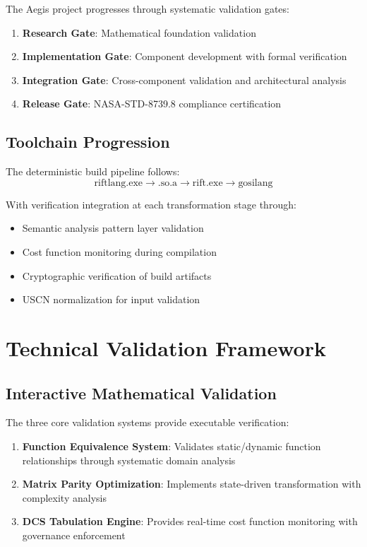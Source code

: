 \documentclass{article}
\begin{document}
The Aegis project progresses through systematic validation gates:

\begin{enumerate}
    \item \textbf{Research Gate}: Mathematical foundation validation
    \item \textbf{Implementation Gate}: Component development with formal verification
    \item \textbf{Integration Gate}: Cross-component validation and architectural analysis
    \item \textbf{Release Gate}: NASA-STD-8739.8 compliance certification
\end{enumerate}

\subsection{Toolchain Progression}

The deterministic build pipeline follows:
\[ \text{riftlang.exe} \to \text{.so.a} \to \text{rift.exe} \to \text{gosilang} \]

With verification integration at each transformation stage through:
\begin{itemize}
    \item Semantic analysis pattern layer validation
    \item Cost function monitoring during compilation
    \item Cryptographic verification of build artifacts
    \item USCN normalization for input validation
\end{itemize}

\section{Technical Validation Framework}

\subsection{Interactive Mathematical Validation}

The three core validation systems provide executable verification:

\begin{enumerate}
    \item \textbf{Function Equivalence System}: Validates static/dynamic function relationships through systematic domain analysis
    \item \textbf{Matrix Parity Optimization}: Implements state-driven transformation with complexity analysis
    \item \textbf{DCS Tabulation Engine}: Provides real-time cost function monitoring with governance enforcement
\end{enumerate}
\end{document}
